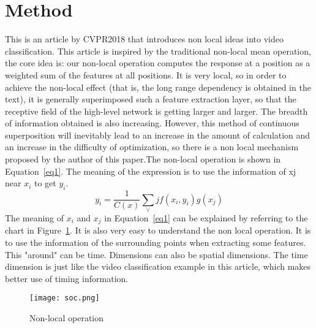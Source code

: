\documentclass[10pt,twocolumn,letterpaper]{article}
\begin{document}
\section{Method}
This is an article by CVPR2018 that introduces non local ideas into video classification. This article is inspired by the traditional non-local mean operation, the core idea is: our non-local operation computes the response at a position as a weighted sum of the features at all positions. It is very local, so in order to achieve the non-local effect (that is, the long range dependency is obtained in the text), it is generally superimposed such a feature extraction layer, so that the receptive field of the high-level network is getting larger and larger. The breadth of information obtained is also increasing. However, this method of continuous superposition will inevitably lead to an increase in the amount of calculation and an increase in the difficulty of optimization, so there is a non local mechanism proposed by the author of this paper.The non-local operation is shown in Equation~\ref{eq1}. The meaning of the expression is to use the information of xj near $x_i$ to get $y_i$.
\begin{equation}
y_i=\frac{1}{C(x)}\sum_\vee{j} f(x_i,y_i)g(x_j)
\end{equation}\label{eq1}
The meaning of $x_i$ and $x_j$ in Equation~\ref{eq1} can be explained by referring to the chart in Figure~\ref{Figure1}. It is also very easy to understand the non local operation. It is to use the information of the surrounding points when extracting some features. This "around" can be time. Dimensions can also be spatial dimensions. The time dimension is just like the video classification example in this article, which makes better use of timing information.
  \begin{figure}[!htb]
  	\centering
  	\texttt{[image: soc.png]}\\
  	\caption{Non-local operation}\label{Figure1}
  \end{figure}
\end{document}
